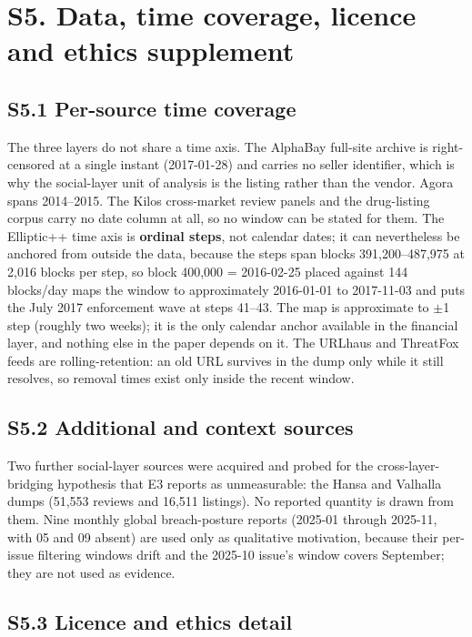 \documentclass[11pt,a4paper]{article}
\begin{document}
\section*{S5. Data, time coverage, licence and ethics supplement}

\subsection*{S5.1 Per-source time coverage}

The three layers do not share a time axis. The AlphaBay full-site archive is
right-censored at a single instant (2017-01-28) and carries no seller identifier,
which is why the social-layer unit of analysis is the listing rather than the
vendor. Agora spans 2014--2015. The Kilos cross-market review panels and the
drug-listing corpus carry no date column at all, so no window can be stated for
them. The Elliptic++ time axis is \textbf{ordinal steps}, not calendar dates;
it can nevertheless be anchored from outside the data, because the steps span
blocks 391,200--487,975 at 2,016 blocks per step, so block 400,000 = 2016-02-25
placed against 144 blocks/day maps the window to approximately 2016-01-01 to
2017-11-03 and puts the July 2017 enforcement wave at steps 41--43. The map is
approximate to $\pm$1 step (roughly two weeks); it is the only calendar anchor
available in the financial layer, and nothing else in the paper depends on it.
The URLhaus and ThreatFox feeds are rolling-retention: an old URL survives in the
dump only while it still resolves, so removal times exist only inside the recent
window.

\subsection*{S5.2 Additional and context sources}

Two further social-layer sources were acquired and probed for the
cross-layer-bridging hypothesis that E3 reports as unmeasurable: the Hansa and
Valhalla dumps (51,553 reviews and 16,511 listings). No reported quantity is
drawn from them. Nine monthly global breach-posture reports (2025-01 through
2025-11, with 05 and 09 absent) are used only as qualitative motivation, because
their per-issue filtering windows drift and the 2025-10 issue's window covers
September; they are not used as evidence.

\subsection*{S5.3 Licence and ethics detail}
\end{document}
